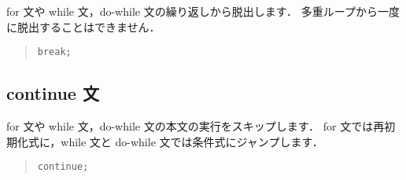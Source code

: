 for 文や while 文，do-while 文の繰り返しから脱出します．
多重ループから一度に脱出することはできません．

\begin{quote}
\begin{verbatim}
break;
\end{verbatim}
\end{quote}

\subsection{continue 文}

for 文や while 文，do-while 文の本文の実行をスキップします．
for 文では再初期化式に，while 文と do-while 文では条件式にジャンプします．

\begin{quote}
\begin{verbatim}
continue;
\end{verbatim}
\end{quote}
